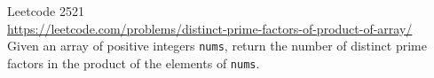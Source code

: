   Leetcode 2521 \\
  \url{https://leetcode.com/problems/distinct-prime-factors-of-product-of-array/} \\
  Given an array of positive integers \verb!nums!,
  return the number of distinct prime factors in the product of the elements of \verb!nums!.
